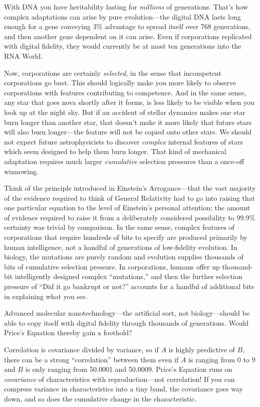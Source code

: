  With DNA you have heritability lasting for \textit{millions} of
generations. That's how complex adaptations can arise
by pure evolution---the digital DNA lasts long enough for a gene
conveying 3\% advantage to spread itself over 768 generations, and then
another gene dependent on it can arise. Even if corporations replicated
with digital fidelity, they would currently be at most ten generations
into the RNA World.


 Now, corporations are certainly \textit{selected}, in the sense
that incompetent corporations go bust. This should logically make you
more likely to observe corporations with features contributing to
competence. And in the same sense, any star that goes nova shortly
after it forms, is less likely to be visible when you look up at the
night sky. But if an accident of stellar dynamics makes one star burn
longer than another star, that doesn't make it more
likely that future stars will also burn longer---the feature will not
be copied onto other stars. We should not expect future astrophysicists
to discover \textit{complex} internal features of stars which seem
designed to help them burn longer. That kind of mechanical adaptation
requires much larger \textit{cumulative} selection pressures than a
once-off winnowing.


 Think of the principle introduced in Einstein's
Arrogance---that the vast majority of the evidence required to think of
General Relativity had to go into raising that one particular equation
to the level of Einstein's personal attention; the
amount of evidence required to raise it from a deliberately considered
possibility to 99.9\% certainty was trivial by comparison. In the same
sense, complex features of corporations that require hundreds of bits
to specify are produced primarily by human intelligence, not a handful
of generations of low-fidelity evolution. In biology, the mutations are
purely random and evolution supplies thousands of bits of cumulative
selection pressure. In corporations, humans offer up thousand-bit
intelligently designed complex
``mutations,'' and then the further
selection pressure of ``Did it go bankrupt or
not?'' accounts for a handful of additional bits in
explaining what you see.


 Advanced molecular nanotechnology---the artificial sort, not
biology---should be able to copy itself with digital fidelity through
thousands of generations. Would Price's Equation
thereby gain a foothold?


 Correlation is covariance divided by variance, so if $A$ is highly
predictive of $B$, there can be a strong
``correlation'' between them even if
$A$ is ranging from 0 to 9 and $B$ is only ranging from 50.0001 and
50.0009. Price's Equation runs on \textit{covariance}
of characteristics with reproduction---not correlation! If you can
compress variance in characteristics into a tiny band, the covariance
goes way down, and so does the cumulative change in the
characteristic.



